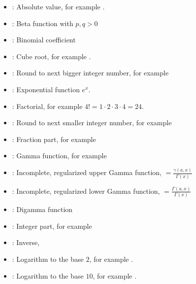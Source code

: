 \begin{itemize}

\item
{}:
Absolute value, for example .

\item
{}:
Beta function with $p,q>0$

\item
{}:
Binomial coefficient

\item
{}:
Cube root, for example .

\item
{}:
Round to next bigger integer number, for example 

\item
{}:
Exponential function $e^x$.

\item
{}:
Factorial, for example $4!=1\cdot2\cdot3\cdot4=24$.

\item
{}:
Round to next smaller integer number, for example 

\item
{}:
Fraction part, for example 

\item
{}:
Gamma function, for example 

\item
{}:
Incomplete, regularized upper Gamma function, $=\frac{\gamma(a,x)}{\Gamma(x)}$

\item
{}:
Incomplete, regularized lower Gamma function, $=\frac{\Gamma(a,x)}{\Gamma(x)}$

\item
{}:
Digamma function

\item
{}:
Integer part, for example 

\item
{}:
Inverse, 

\item
{}:
Logarithm to the base $2$, for example .

\item
{}:
Logarithm to the base $10$, for example .


\end{itemize}
